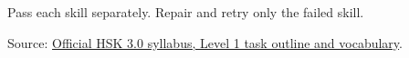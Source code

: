 Pass each skill separately. Repair and retry only the failed skill.

\begin{tcolorbox}[breakable,colback=teal!4,colframe=teal!35!black,title={Before you move on}]
Source: \href{https://hsk.cn-bj.ufileos.com/3.0/\%E6\%96\%B0\%E7\%89\%88HSK\%E8\%80\%83\%E8\%AF\%95\%E5\%A4\%A7\%E7\%BA\%B21219.pdf}{Official HSK 3.0 syllabus, Level 1 task outline and vocabulary}.
\end{tcolorbox}
